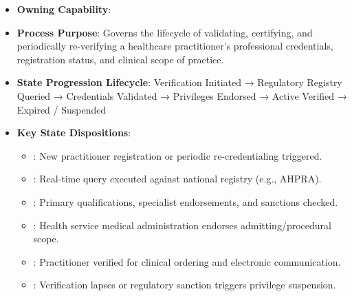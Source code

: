 \begin{itemize}

\item 
\textbf{Owning Capability}: \texttt{}



\item 
\textbf{Process Purpose}: Governs the lifecycle of validating, certifying, and periodically re-verifying a healthcare practitioner's professional credentials, registration status, and clinical scope of practice.



\item 
\textbf{State Progression Lifecycle}: Verification Initiated → Regulatory Registry Queried → Credentials Validated → Privileges Endorsed → Active Verified → Expired /\allowbreak{} Suspended



\item 
\textbf{Key State Dispositions}:


\begin{itemize}

\item 
\texttt{}: New practitioner registration or periodic re-credentialing triggered.



\item 
\texttt{}: Real-time query executed against national registry (e.g., AHPRA).



\item 
\texttt{}: Primary qualifications, specialist endorsements, and sanctions checked.



\item 
\texttt{}: Health service medical administration endorses admitting/\allowbreak{}procedural scope.



\item 
\texttt{}: Practitioner verified for clinical ordering and electronic communication.



\item 
\texttt{}: Verification lapses or regulatory sanction triggers privilege suspension.



\end{itemize}


\end{itemize}
\label{rad:processes:98}

